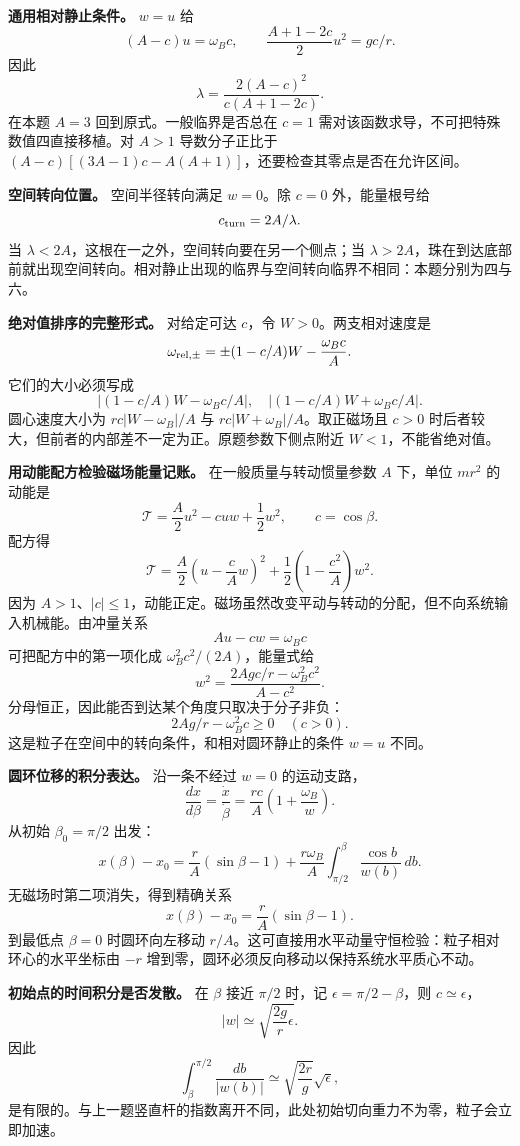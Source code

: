 \documentclass[12pt,a4paper,UTF8]{ctexart}
\begin{document}
\textbf{通用相对静止条件。} \(w=u\) 给 \[
(A-c)u=\omega_Bc,\qquad
\frac{A+1-2c}{2}u^2=gc/r.
\] 因此 \[
\lambda=\frac{2(A-c)^2}{c(A+1-2c)}.
\] 在本题 \(A=3\) 回到原式。一般临界是否总在 \(c=1\)
需对该函数求导，不可把特殊数值四直接移植。对 \(A>1\) 导数分子正比于
\((A-c)[(3A-1)c-A(A+1)]\)，还要检查其零点是否在允许区间。

\textbf{空间转向位置。} 空间半径转向满足 \(w=0\)。除 \(c=0\)
外，能量根号给 \[
c_{\rm turn}=2A/\lambda.
\] 当 \(\lambda<2A\)，这根在一之外，空间转向要在另一个侧点；当
\(\lambda>2A\)，珠在到达底部前就出现空间转向。相对静止出现的临界与空间转向临界不相同：本题分别为四与六。

\textbf{绝对值排序的完整形式。} 对给定可达 \(c\)，令
\(W>0\)。两支相对速度是 \[
\omega_{\rm rel,\pm}=
\pm(1-c/A)W-\frac{\omega_Bc}{A}.
\] 它们的大小必须写成 \[
\left|(1-c/A)W-\omega_Bc/A\right|,
\quad
\left|(1-c/A)W+\omega_Bc/A\right|.
\] 圆心速度大小为 \(r c|W-\omega_B|/A\) 与
\(r c|W+\omega_B|/A\)。取正磁场且 \(c>0\)
时后者较大，但前者的内部差不一定为正。原题参数下侧点附近
\(W<1\)，不能省绝对值。

\textbf{用动能配方检验磁场能量记账。} 在一般质量与转动惯量参数 \(A\)
下，单位 \(mr^2\) 的动能是 \[
\mathcal T=\frac A2u^2-cuw+\frac12w^2,\qquad c=\cos\beta.
\] 配方得 \[
\mathcal T=\frac A2\left(u-\frac cA w\right)^2
+\frac12\left(1-\frac{c^2}{A}\right)w^2.
\] 因为
\(A>1\)、\(|c|\le1\)，动能正定。磁场虽然改变平动与转动的分配，但不向系统输入机械能。由冲量关系
\[
Au-cw=\omega_Bc
\] 可把配方中的第一项化成 \(\omega_B^2c^2/(2A)\)，能量式给 \[
w^2=\frac{2Agc/r-\omega_B^2c^2}{A-c^2}.
\] 分母恒正，因此能否到达某个角度只取决于分子非负： \[
2Ag/r-\omega_B^2c\ge0\quad(c>0).
\] 这是粒子在空间中的转向条件，和相对圆环静止的条件 \(w=u\) 不同。

\textbf{圆环位移的积分表达。} 沿一条不经过 \(w=0\) 的运动支路， \[
\frac{dx}{d\beta}=\frac{\dot x}{\dot\beta}
=\frac{rc}{A}\left(1+\frac{\omega_B}{w}\right).
\] 从初始 \(\beta_0=\pi/2\) 出发： \[
x(\beta)-x_0=
\frac rA(\sin\beta-1)
+\frac{r\omega_B}{A}
\int_{\pi/2}^{\beta}\frac{\cos b}{w(b)}\,db.
\] 无磁场时第二项消失，得到精确关系 \[
\boxed{x(\beta)-x_0=\frac rA(\sin\beta-1)}.
\] 到最低点 \(\beta=0\) 时圆环向左移动
\(r/A\)。这可直接用水平动量守恒检验：粒子相对环心的水平坐标由 \(-r\)
增到零，圆环必须反向移动以保持系统水平质心不动。

\textbf{初始点的时间积分是否发散。} 在 \(\beta\) 接近 \(\pi/2\) 时，记
\(\epsilon=\pi/2-\beta\)，则 \(c\simeq\epsilon\)， \[
|w|\simeq\sqrt{\frac{2g}{r}\epsilon}.
\] 因此 \[
\int_{\beta}^{\pi/2}\frac{db}{|w(b)|}
\simeq\sqrt{\frac{2r}{g}}\sqrt{\epsilon},
\]
是有限的。与上一题竖直杆的指数离开不同，此处初始切向重力不为零，粒子会立即加速。
\end{document}
